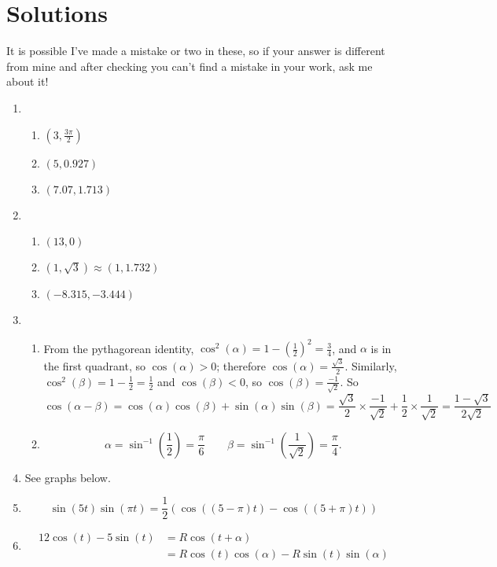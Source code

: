 \documentclass{article}
\begin{document}
\clearpage

\section{Solutions}

It is possible I've made a mistake or two in these, so if your answer is different from mine and after checking you can't find a mistake in your work, ask me about it!

\begin{enumerate}
\item 
	\begin{enumerate}
	\item $\left(3,\frac{3\pi}{2}\right)$
	\item $(5,0.927)$
	\item $(7.07,1.713)$
	\end{enumerate}
\item
	\begin{enumerate}
	\item $(13,0)$
	\item $(1,\sqrt{3})\approx(1,1.732)$
	\item $(-8.315,-3.444)$
	\end{enumerate}
\item
	\begin{enumerate}
	\item From the pythagorean identity, $\cos^2(\alpha)=1-\left(\frac{1}{2}\right)^2=\frac{3}{4}$, and $\alpha$ is in the first quadrant, so $\cos(\alpha)>0$; therefore $\cos(\alpha)=\frac{\sqrt{3}}{2}$. Similarly, $\cos^2(\beta)=1-\frac{1}{2}=\frac{1}{2}$ and $\cos(\beta)<0$, so $\cos(\beta)=\frac{-1}{\sqrt{2}}$. So
	\[\cos(\alpha-\beta)=\cos(\alpha)\cos(\beta)+\sin(\alpha)\sin(\beta)=\frac{\sqrt{3}}{2}\times\frac{-1}{\sqrt{2}}+\frac{1}{2}\times\frac{1}{\sqrt{2}}=\frac{1-\sqrt{3}}{2\sqrt{2}}\]
	\item \[\alpha=\sin^{-1}\left(\frac{1}{2}\right) = \frac{\pi}{6}\qquad \beta=\sin^{-1}\left(\frac{1}{\sqrt{2}}\right)=\frac{\pi}{4}.\]
	\end{enumerate}
\item See graphs below.
\item
	\[\sin(5t)\sin(\pi t)=\frac{1}{2}\left(\cos((5-\pi)t)-\cos((5+\pi)t)\right)\]
\item
	\begin{align*}
	12\cos(t)-5\sin(t)&=R\cos(t+\alpha)\\
	&=R\cos(t)\cos(\alpha)-R\sin(t)\sin(\alpha)
	\end{align*}

\end{enumerate}
\end{document}

